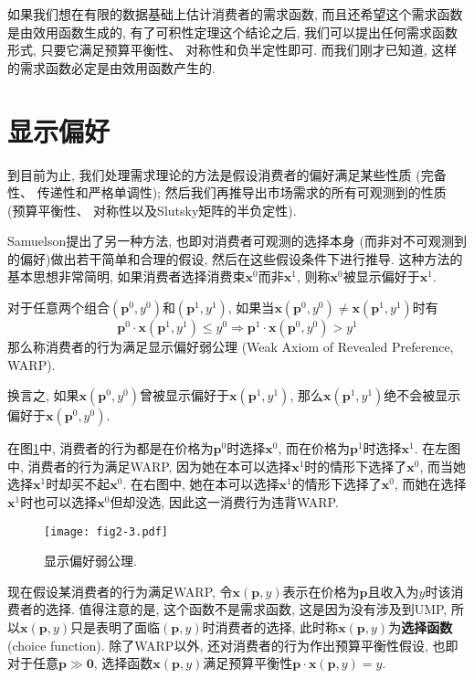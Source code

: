 \documentclass[cn, 12pt, math=mtpro2, bibstyle=apa, blue, twocol]{elegantbook}
\newcommand{\p}{\mathbf{p}}
\newcommand{\x}{\mathbf{x}}
\begin{document}
如果我们想在有限的数据基础上估计消费者的需求函数, 而且还希望这个需求函数是由效用函数生成的, 有了可积性定理这个结论之后, 我们可以提出任何需求函数形式, 只要它满足预算平衡性、 对称性和负半定性即可. 而我们刚才已知道, 这样的需求函数必定是由效用函数产生的.
\section{显示偏好}
到目前为止, 我们处理需求理论的方法是假设消费者的偏好满足某些性质 (完备性、 传递性和严格单调性); 然后我们再推导出市场需求的所有可观测到的性质 (预算平衡性、 对称性以及Slutsky矩阵的半负定性).

Samuelson提出了另一种方法, 也即对消费者可观测的选择本身 (而非对不可观测到的偏好)做出若干简单和合理的假设, 然后在这些假设条件下进行推导. 这种方法的基本思想非常简明, 如果消费者选择消费束$\x^0$而非$\x^1$, 则称$\x^0$被显示偏好于$\x^1$.

\begin{definition}
对于任意两个组合$(\p^0,y^0)$和$(\p^1,y^1)$, 如果当$\x(\p^0,y^0)\neq \x(\p^1,y^1)$时有
$$\p^0\cdot\x(\p^1,y^1)\leq y^0\Rightarrow\p^1\cdot\x(\p^0,y^0)>y^1$$
那么称消费者的行为满足显示偏好弱公理 (Weak Axiom of Revealed Preference, WARP).
\end{definition}
换言之, 如果$\x(\p^0,y^0)$曾被显示偏好于$\x(\p^1,y^1)$, 那么$\x(\p^1,y^1)$绝不会被显示偏好于$\x(\p^0,y^0)$.

在图\ref{fig2.3}中, 消费者的行为都是在价格为$\p^0$时选择$\x^0$, 而在价格为$\p^1$时选择$\x^1$. 在左图中, 消费者的行为满足WARP, 因为她在本可以选择$\x^1$时的情形下选择了$\x^0$, 而当她选择$\x^1$时却买不起$\x^0$. 在右图中, 她在本可以选择$\x^1$的情形下选择了$\x^0$, 而她在选择$\x^1$时也可以选择$\x^0$但却没选, 因此这一消费行为违背WARP.

\begin{figure}[htbp!]
  \centering
  \texttt{[image: fig2-3.pdf]}
  \caption{显示偏好弱公理.}\label{fig2.3}
\end{figure}

现在假设某消费者的行为满足WARP, 令$\x(\p,y)$表示在价格为$\p$且收入为$y$时该消费者的选择. 值得注意的是, 这个函数不是需求函数, 这是因为没有涉及到UMP, 所以$\x(\p,y)$只是表明了面临$(\p,y)$时消费者的选择, 此时称$\x(\p,y)$为\textbf{选择函数} (choice function). 除了WARP以外, 还对消费者的行为作出预算平衡性假设, 也即对于任意$\p\gg\mathbf{0}$, 选择函数$\x(\p,y)$满足预算平衡性$\p\cdot\x(\p,y)=y$.
\end{document}
